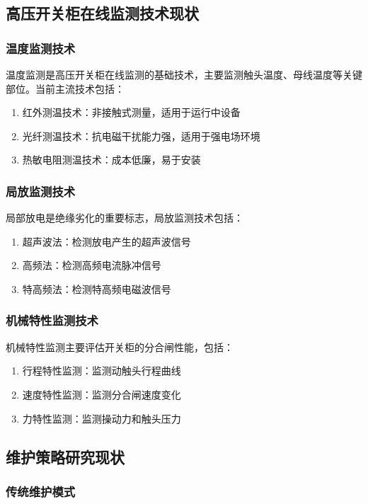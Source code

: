 \subsection{高压开关柜在线监测技术现状}

\subsubsection{温度监测技术}

温度监测是高压开关柜在线监测的基础技术，主要监测触头温度、母线温度等关键部位。当前主流技术包括：
\begin{enumerate}
    \item 红外测温技术：非接触式测量，适用于运行中设备
    \item 光纤测温技术：抗电磁干扰能力强，适用于强电场环境
    \item 热敏电阻测温技术：成本低廉，易于安装
\end{enumerate}

\subsubsection{局放监测技术}

局部放电是绝缘劣化的重要标志，局放监测技术包括：
\begin{enumerate}
    \item 超声波法：检测放电产生的超声波信号
    \item 高频法：检测高频电流脉冲信号
    \item 特高频法：检测特高频电磁波信号
\end{enumerate}

\subsubsection{机械特性监测技术}

机械特性监测主要评估开关柜的分合闸性能，包括：
\begin{enumerate}
    \item 行程特性监测：监测动触头行程曲线
    \item 速度特性监测：监测分合闸速度变化
    \item 力特性监测：监测操动力和触头压力
\end{enumerate}

\subsection{维护策略研究现状}

\subsubsection{传统维护模式}

